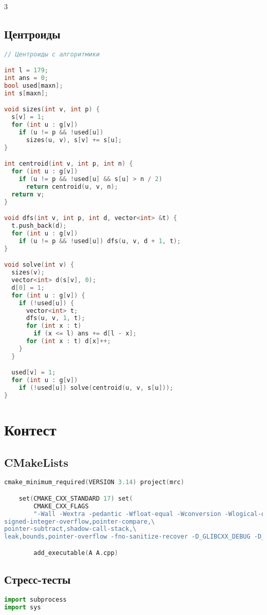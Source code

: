 \documentclass[10pt,a4paper,landscape,twosided]{extarticle}
\begin{document}
\begin{multicols}{3}
\subsection{Центроиды}
\begin{lstlisting}[language=C++]
// Центроиды с алгоритмики

int l = 179;
int ans = 0;
bool used[maxn];
int s[maxn];

void sizes(int v, int p) {
  s[v] = 1;
  for (int u : g[v])
    if (u != p && !used[u])
      sizes(u, v), s[v] += s[u];
}

int centroid(int v, int p, int n) {
  for (int u : g[v])
    if (u != p && !used[u] && s[u] > n / 2)
      return centroid(u, v, n);
  return v;
}

void dfs(int v, int p, int d, vector<int> &t) {
  t.push_back(d);
  for (int u : g[v])
    if (u != p && !used[u]) dfs(u, v, d + 1, t);
}

void solve(int v) {
  sizes(v);
  vector<int> d(s[v], 0);
  d[0] = 1;
  for (int u : g[v]) {
    if (!used[u]) {
      vector<int> t;
      dfs(u, v, 1, t);
      for (int x : t)
        if (x <= l) ans += d[l - x];
      for (int x : t) d[x]++;
    }
  }

  used[v] = 1;
  for (int u : g[v])
    if (!used[u]) solve(centroid(u, v, s[u]));
}
\end{lstlisting}

\section{Контест}

\subsection{CMakeLists}
\begin{lstlisting}[language=C++]
cmake_minimum_required(VERSION 3.14) project(mrc)

    set(CMAKE_CXX_STANDARD 17) set(
        CMAKE_CXX_FLAGS
        "-Wall -Wextra -pedantic -Wfloat-equal -Wconversion -Wlogical-op -Wshift-overflow=2 -fsanitize=address,undefined,\
signed-integer-overflow,pointer-compare,\
pointer-subtract,shadow-call-stack,\
leak,bounds,pointer-overflow -fno-sanitize-recover -D_GLIBCXX_DEBUG -D_GLIBCXX_DEBUG_PEDANTIC -DONPC")

        add_executable(A A.cpp)
\end{lstlisting}

\subsection{Стресс-тесты}
\begin{lstlisting}[language=Python]
import subprocess
import sys


\end{lstlisting}
\end{multicols}
\end{document}
